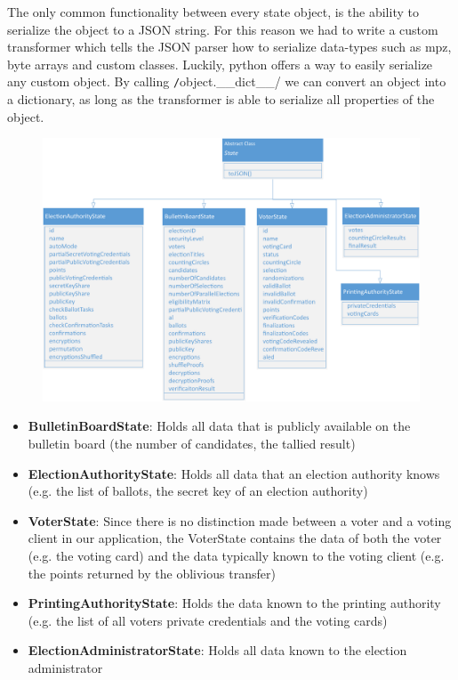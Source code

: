 The only common functionality between every state object, is the ability to serialize the object to a JSON string. For this reason we had to write a custom transformer which tells the JSON parser how to serialize data-types such as mpz, byte arrays and custom classes. Luckily, python offers a way to easily serialize any custom object. By calling \texttt/object.__dict__/ we can convert an object into a dictionary, as long as the transformer is able to serialize all properties of the object.
\begin{figure}
\begin{center}
\includegraphics[scale=0.60]{assets/uml_states.pdf}
\label{State classes}%
\end{center}
\end{figure}

\begin{itemize}
	\item \textbf{BulletinBoardState}: Holds all data that is publicly available on the bulletin board (the number of candidates, the tallied result)
	\item \textbf{ElectionAuthorityState}: Holds all data that an election authority knows (e.g. the list of ballots, the secret key of an election authority)
	\item \textbf{VoterState}: Since there is no distinction made between a voter and a voting client in our application, the VoterState contains the data of both the voter (e.g. the voting card) and the data typically known to the voting client (e.g. the points returned by the oblivious transfer)
	\item \textbf{PrintingAuthorityState}: Holds the data known to the printing authority (e.g. the list of all voters private credentials and the voting cards)
	\item \textbf{ElectionAdministratorState}: Holds all data known to the election administrator
\end{itemize}

